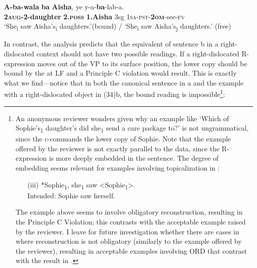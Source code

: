 \documentclass[output=paper
,newtxmath
,modfonts
,nonflat]{langsci/langscibook}
\begin{document}
\ex\label{ex:ranero:33b}
\gll \textbf{A-ba-wala} \textbf{ba}        \textbf{Aisha},   ye   y-a-\textbf{ba}{}-lab-a.\\
\textbf{2\textsc{aug}}\textbf{{}-2-daughter} \textbf{2.}\textbf{\textsc{poss}} \textbf{1.Aisha} 3sg \textsc{1sa-pst-}\textbf{\textsc{2om}}{}-see-\textsc{fv}\\
\glt ‘She\textsubscript{i} saw Aisha’s\textsubscript{i} daughters.’(bound) / ‘She\textsubscript{i} saw Aisha’s\textsubscript{j} daughters.’ (free)
\z
\z

\textup{In contrast, the analysis predicts that the equivalent of sentence b in a right-dislocated context should not have two possible readings. If a right-dislocated R-expression moves out of the VP to its surface position, the lower copy should be bound by the  at LF and a Principle C violation would result. This is exactly what we find—notice that in both the canonical sentence in a and the example with a right-dislocated object in (34)b, the bound reading is impossible}\footnote{An anonymous reviewer wonders given  why an  example like ‘Which of Sophie’s\textsubscript{1} daughter’s did she\textsubscript{1} send a care package to?’ is not ungrammatical, since the  c-commands the lower copy of Sophie. Note that the example offered by the reviewer is not exactly parallel to the  data, since the R-expression is more deeply embedded in the  sentence. The degree of embedding seems relevant for examples involving topicalization in :
\begin{enumerate}
\item[(iii)] *Sophie\textsubscript{1}, she\textsubscript{1} saw <Sophie\textsubscript{1}>.\\Intended: Sophie saw herself.
\end{enumerate}
The example above seems to involve obligatory reconstruction, resulting in the Principle C Violation; this contrasts with the acceptable example raised by the reviewer. I leave for future investigation whether there are cases in  where reconstruction is not obligatory (similarly to the example offered by the reviewer), resulting in acceptable examples involving ORD that contrast with the result in .}\textup{:}
\end{document}
